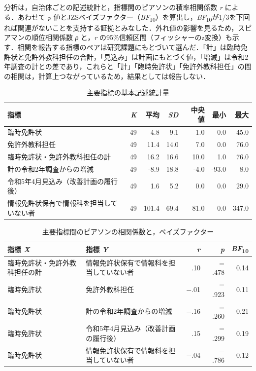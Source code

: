 \documentclass[a4paper,10pt,twocolumn]{ltjsarticle}
\begin{document}
分析は，自治体ごとの記述統計と，指標間のピアソンの積率相関係数 \textit{r} による．あわせて \textit{p} 値とJZSベイズファクター（\textit{BF}\textsubscript{10}）を算出し，\textit{BF}\textsubscript{10}が1/3を下回れば関連がないことを支持する証拠とみなした．外れ値の影響を見るため，スピアマンの順位相関係数 \textit{ρ} と，\textit{r} の95\%信頼区間（フィッシャーのz変換）も示す．相関を報告する指標のペアは研究課題にもとづいて選んだ．「計」は臨時免許状と免許外教科担任の合計，「見込み」は計画にもとづく値，「増減」は令和2年調査の計との差であり，これらと「計」「臨時免許状」「免許外教科担任」の間の相関は，計算上つながっているため，結果としては報告しない．
\begin{table}[!t]
\caption{主要指標の基本記述統計量}
\centering\small
\begin{tabular}{>{\raggedright\arraybackslash}p{9.2cm}rrrrrr}
\toprule
指標 & \textit{K} & 平均 & \textit{SD} & 中央値 & 最小 & 最大 \\
\midrule
臨時免許状 & 49 & 4.8 & 9.1 & 1.0 & 0.0 & 45.0 \\
免許外教科担任 & 49 & 11.4 & 14.0 & 7.0 & 0.0 & 76.0 \\
臨時免許状・免許外教科担任の計 & 49 & 16.2 & 16.6 & 10.0 & 1.0 & 76.0 \\
計の令和2年調査からの増減 & 49 & -8.9 & 18.8 & -4.0 & -93.0 & 8.0 \\
令和5年4月見込み（改善計画の履行後） & 49 & 1.6 & 5.2 & 0.0 & 0.0 & 29.0 \\
情報免許状保有で情報科を担当していない者 & 49 & 101.4 & 69.4 & 81.0 & 0.0 & 347.0 \\
\bottomrule
\end{tabular}
\par{}
\end{table}
\begin{table}[!t]
\caption{主要指標間のピアソンの相関係数と，ベイズファクター}
\centering\small
\begin{tabular}{>{\raggedright\arraybackslash}p{6.4cm}>{\raggedright\arraybackslash}p{6.4cm}rrr}
\toprule
指標 \textit{X} & 指標 \textit{Y} & \textit{r} & \textit{p} & \textit{BF}\textsubscript{10} \\
\midrule
臨時免許状・免許外教科担任の計 & 情報免許状保有で情報科を担当していない者 & .10 & = .478 & 0.14 \\
臨時免許状 & 免許外教科担任 & −.01 & = .923 & 0.11 \\
臨時免許状 & 計の令和2年調査からの増減 & −.16 & = .260 & 0.21 \\
臨時免許状 & 令和5年4月見込み（改善計画の履行後） & .15 & = .299 & 0.19 \\
臨時免許状 & 情報免許状保有で情報科を担当していない者 & −.04 & = .786 & 0.12 \\
\bottomrule
\end{tabular}
\par{}
\end{table}
\end{document}
